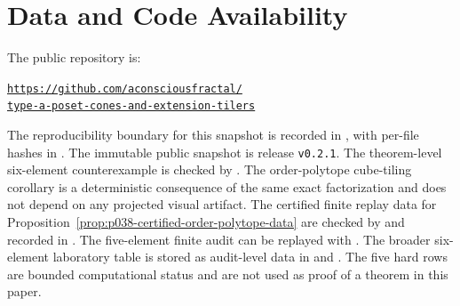 \documentclass[11pt,a4paper]{article}
\theoremstyle{definition}
\begin{document}
\section*{Data and Code Availability}
The public repository is:
\begin{center}
\small
\href{https://github.com/aconsciousfractal/type-a-poset-cones-and-extension-tilers}
{\texttt{https://github.com/aconsciousfractal/}}\\
\href{https://github.com/aconsciousfractal/type-a-poset-cones-and-extension-tilers}
{\texttt{type-a-poset-cones-and-extension-tilers}}
\end{center}
The reproducibility boundary for this snapshot is recorded in
, with per-file hashes in .
The immutable public snapshot is release \texttt{v0.2.1}.
The theorem-level six-element
counterexample is checked by
.  The order-polytope
cube-tiling corollary is a deterministic consequence of the same exact
factorization and does not depend on any projected visual artifact.  The
certified finite replay data for
Proposition~\ref{prop:p038-certified-order-polytope-data} are checked by
 and recorded in
.  The five-element
finite audit can be replayed with
.  The broader
six-element laboratory table is stored as audit-level data in
 and
.  The five hard rows are
bounded computational status and are not used as proof of a theorem in this
paper.



\end{document}
